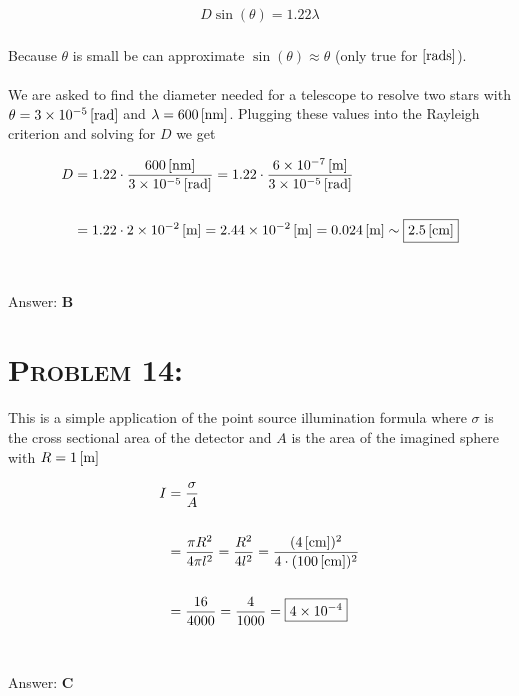 \documentclass{article}
\providecommand{\e}[1]{\ensuremath{\times 10^{#1}}}
\begin{document}
\begin{gather}
D \sin{(\theta)} = 1.22 \lambda
\end{gather}
\\
Because $\theta$ is small be can approximate $\sin{(\theta)} \approx \theta$ (only true for $\unit[]{[rads]}$).\\
\\
We are asked to find the diameter needed for a telescope to resolve two stars with $\theta = \unit[3\e{-5}]{[rad]}$  and $\lambda = \unit[600]{[nm]}$. Plugging these values into the Rayleigh criterion and solving for $D$ we get

\begin{align}
D &= 1.22 \cdot \frac{ \unit[600]{[nm]}}{ \unit[3\e{-5}]{[rad]}}  = 1.22\cdot  \frac{\unit[6\e{-7}]{[m]}}{\unit[3\e{-5}]{[rad]}}\nonumber\\
\nonumber\\
&= 1.22\cdot \unit[2\e{-2}]{[m]} = \unit[2.44\e{-2}]{[m]} = \unit[0.024]{[m]} \sim \boxed{\unit[2.5]{[cm]}}\nonumber
\end{align}
\\\\
Answer: \textbf{\textcolor{ProcessBlue}B}\\


\section{\textsc{Problem 14:}} This is a simple application of the point source illumination formula where $\sigma$ is the cross sectional area of the detector and $A$ is the area of the imagined sphere with $R = \unit[1]{[m]}$

\begin{align}
I &= \frac{\sigma}{A} \\
\nonumber\\
&= \frac{\pi R^{2}} {4 \pi l^{2}} = \frac{R^{2}} {4 l^{2}} = \frac{(\unit[4]{[cm]})^{2}} {4 \cdot (\unit[100]{[cm]})^{2}} \nonumber\\
\nonumber\\
&= \frac{16}{4000} = \frac{4}{1000} = \boxed{4\e{-4}}\nonumber
\end{align}
\\\\
Answer: \textbf{\textcolor{ProcessBlue}C}\\

\end{document}
